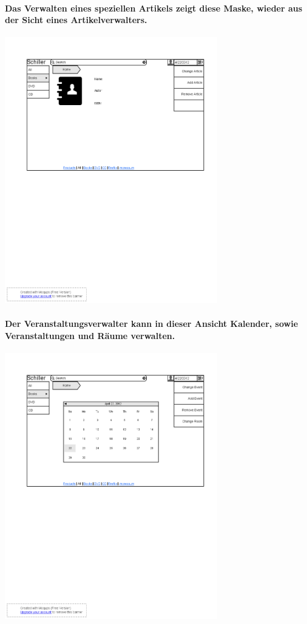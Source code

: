 \documentclass[a4paper]{article}
\begin{document}
\paragraph{Das Verwalten eines speziellen Artikels zeigt diese Maske, wieder aus der Sicht eines Artikelverwalters.\\}
\includegraphics[width=350px]{17ChangeArticle.png}

\paragraph{Der Veranstaltungsverwalter kann in dieser Ansicht Kalender, sowie Veranstaltungen und Räume verwalten.\\}
\includegraphics[width=350px]{18ChangeCalender.png}
\end{document}
